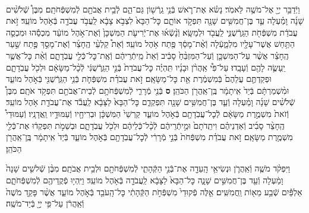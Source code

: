 \documentclass[twoside, openany, parskip=half, 11pt]{book}
\begin{document}
\begin{footnotesize}
\begin{multicols}{2}
\\
וַיְֿדַבֵּ֥ר יְיָ֖ אֶל־מֹשֶׁ֥ה לֵּאמֹֽר׃ נָשׂ֗א אֶת־רֹ֛אשׁ בְּֿנֵ֥י גֵֽרְֿשׁ֖וֹן גַּם־הֵ֑ם לְֿבֵ֥ית אֲבֹתָ֖ם לְֿמִשְׁפְּֿחֹתָֽם׃ מִבֶּן֩ שְֿׁלֹשִׁ֨ים שָׁנָ֜ה וָמַ֗עְלָה עַ֛ד בֶּן־חֲמִשִּׁ֥ים שָׁנָ֖ה תִּפְקֹ֣ד אוֹתָ֑ם כׇּל־הַבָּא֙ לִצְבֹ֣א צָבָ֔א לַֽעֲבֹ֥ד עֲבֹדָ֖ה בְּֿאֹ֥הֶל מוֹעֵֽד׃ זֹ֣את עֲבֹדַ֔ת מִשְׁפְּֿחֹ֖ת הַגֵּֽרְֿשֻׁנִּ֑י לַֽעֲבֹ֖ד וּלְמַשָּֽׂא׃  וְֿנָ֨שְֿׂא֜וּ אֶת־יְֿרִיעֹ֤ת הַמִּשְׁכָּן֙ וְֿאֶת־אֹ֣הֶל מוֹעֵ֔ד מִכְסֵ֕הוּ וּמִכְסֵ֛ה הַתַּ֥חַשׁ אֲשֶׁר־עָלָ֖יו מִלְמָ֑עְֿלָה וְֿאֶ֨ת־מָסַ֔ךְ פֶּ֖תַח אֹ֥הֶל מוֹעֵֽד׃ וְֿאֵת֩ קַלְעֵ֨י הֶֽחָצֵ֜ר וְֿאֶת־מָסַ֣ךְ פֶּ֣תַח שַׁ֣עַר הֶֽחָצֵ֗ר אֲשֶׁ֨ר עַל־הַמִּשְׁכָּ֤ן וְֿעַל־הַמִּזְבֵּ֨חַ֙ סָבִ֔יב וְֿאֵת֙ מֵֽיתְֿרֵיהֶ֔ם וְֿאֶֽת־כׇּל־כְּֿלֵ֖י עֲבֹֽדָתָ֑ם וְֿאֵ֨ת כׇּל־אֲשֶׁ֧ר יֵֽעָשֶׂ֛ה לָהֶ֖ם וְֿעָבָֽדוּ׃ עַל־פִּ֩י אַֽהֲרֹ֨ן וּבָנָ֜יו תִּֽהְיֶ֗ה כׇּל־עֲבֹדַת֙ בְּֿנֵ֣י הַגֵּֽרְֿשֻׁנִּ֔י לְֿכָ֨ל־מַשָּׂאָ֔ם וּלְכֹ֖ל עֲבֹֽדָתָ֑ם וּפְקַדְתֶּ֤ם עֲלֵהֶם֙ בְּֿמִשְׁמֶ֔רֶת אֵ֖ת כׇּל־מַשָּׂאָֽם׃ זֹ֣את עֲבֹדַ֗ת מִשְׁפְּֿחֹ֛ת בְּֿנֵ֥י הַגֵּֽרְֿשֻׁנִּ֖י בְּֿאֹ֣הֶל מוֹעֵ֑ד וּמִ֨שְׁמַרְתָּ֔ם בְּֿיַד֙ אִֽיתָמָ֔ר בֶּֽן־אַֽהֲרֹ֖ן הַכֹּהֵֽן׃ \textbf{ס}  בְּֿנֵ֖י מְֿרָרִ֑י לְֿמִשְׁפְּֿחֹתָ֥ם לְֿבֵית־אֲבֹתָ֖ם תִּפְקֹ֥ד אֹתָֽם׃ מִבֶּן֩ שְֿׁלֹשִׁ֨ים שָׁנָ֜ה וָמַ֗עְלָה וְֿעַ֛ד בֶּן־חֲמִשִּׁ֥ים שָׁנָ֖ה תִּפְקְדֵ֑ם כׇּל־הַבָּא֙ לַצָּבָ֔א לַֽעֲבֹ֕ד אֶת־עֲבֹדַ֖ת אֹ֥הֶל מוֹעֵֽד׃ וְֿזֹאת֙ מִשְׁמֶ֣רֶת מַשָּׂאָ֔ם לְֿכׇל־עֲבֹֽדָתָ֖ם בְּֿאֹ֣הֶל מוֹעֵ֑ד קַרְשֵׁי֙ הַמִּשְׁכָּ֔ן וּבְרִיחָ֖יו וְֿעַמּוּדָ֥יו וַֽאֲדָנָֽיו׃ וְֿעַמּוּדֵי֩ הֶֽחָצֵ֨ר סָבִ֜יב וְֿאַדְנֵיהֶ֗ם וִיתֵֽדֹתָם֙ וּמֵ֣יתְֿרֵיהֶ֔ם לְֿכָ֨ל־כְּֿלֵיהֶ֔ם וּלְכֹ֖ל עֲבֹֽדָתָ֑ם וּבְשֵׁמֹ֣ת תִּפְקְד֔וּ אֶת־כְּֿלֵ֖י מִשְׁמֶ֥רֶת מַשָּׂאָֽם׃ זֹ֣את עֲבֹדַ֗ת מִשְׁפְּֿחֹת֙ בְּֿנֵ֣י מְֿרָרִ֔י לְֿכׇל־עֲבֹֽדָתָ֖ם בְּֿאֹ֣הֶל מוֹעֵ֑ד בְּֿיַד֙ אִֽיתָמָ֔ר בֶּֽן־אַֽהֲרֹ֖ן הַכֹּהֵֽן׃


וַיִּפְקֹ֨ד מֹשֶׁ֧ה וְֿאַֽהֲרֹ֛ן וּנְשִׂיאֵ֥י הָֽעֵדָ֖ה אֶת־בְּֿנֵ֣י הַקְּֿהָתִ֑י לְֿמִשְׁפְּֿחֹתָ֖ם וּלְבֵ֥ית אֲבֹתָֽם׃ מִבֶּ֨ן שְֿׁלשִׁ֤ים שָׁנָה֙ וָמַ֔עְלָה וְֿעַ֖ד בֶּן־חֲמִשִּׁ֣ים שָׁנָ֑ה כׇּל־הַבָּא֙ לַצָּבָ֔א לַֽעֲבֹדָ֖ה בְּֿאֹ֥הֶל מוֹעֵֽד׃ וַיִּֽהְי֥וּ פְֿקֻֽדֵיהֶ֖ם לְֿמִשְׁפְּֿחֹתָ֑ם אַלְפַּ֕יִם שְֿׁבַ֥ע מֵא֖וֹת וַֽחֲמִשִּֽׁים׃ אֵ֤לֶּה פְֿקוּדֵי֙ מִשְׁפְּֿחֹ֣ת הַקְּֿהָתִ֔י כׇּל־הָֽעֹבֵ֖ד בְּֿאֹ֣הֶל מוֹעֵ֑ד אֲשֶׁ֨ר פָּקַ֤ד מֹשֶׁה֙ וְֿאַֽהֲרֹ֔ן עַל־פִּ֥י יְיָ֖ בְּֿיַד־מֹשֶֽׁה׃



\end{multicols}
\end{footnotesize}
\end{document}
